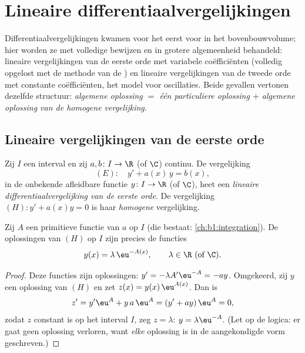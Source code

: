 \chapter{Lineaire differentiaalvergelijkingen}\label{ch:b1:diffeq}

Differentiaalvergelijkingen kwamen voor het eerst voor in het
bovenbouwvolume; hier worden ze met volledige bewijzen en in grotere
algemeenheid behandeld: lineaire vergelijkingen van de eerste orde met
variabele coëfficiënten (volledig opgelost met de methode van de ) en lineaire vergelijkingen van de tweede orde met
constante coëfficiënten, het model voor oscillaties. Beide gevallen
vertonen dezelfde structuur: \emph{algemene oplossing $=$ één particuliere
oplossing $+$ algemene oplossing van de homogene vergelijking}.

\section{Lineaire vergelijkingen van de eerste orde}

\begin{definition}\label{def:b1:diffeq:linear1}
Zij $I$ een interval en zij $a, b \colon I \to \R$ (of $\C$) continu. De
vergelijking
\[
(E)\colon\quad y' + a(x)\,y = b(x),
\]
in de onbekende afleidbare functie $y \colon I \to \R$ (of $\C$), heet een
\emph{lineaire differentiaalvergelijking van de eerste
orde}. De
vergelijking $(H)\colon y' + a(x) y = 0$ is haar \emph{homogene}
vergelijking.
\end{definition}

\begin{theorem}\label{thm:b1:diffeq:homogeneous1}
Zij $A$ een primitieve functie van $a$ op $I$ (die bestaat:
\cref{ch:b1:integration}). De oplossingen van $(H)$ op $I$ zijn precies de
functies
\[
y(x) = \lambda\, \eu^{-A(x)}, \qquad \lambda \in \R \text{ (of } \C).
\]
\end{theorem}

\begin{proof}
Deze functies zijn oplossingen: $y' = -\lambda A' \eu^{-A} = -a y$.
Omgekeerd, zij $y$ een oplossing van $(H)$ en zet $z(x) = y(x)\,
\eu^{A(x)}$. Dan is
\[
z' = y' \eu^{A} + y\, a\, \eu^{A} = (y' + ay)\, \eu^{A} = 0 ,
\]
zodat $z$ constant is op het interval $I$, zeg $z = \lambda$: $y = \lambda
\eu^{-A}$. (Let op de logica: er gaat geen oplossing verloren, want
\emph{elke} oplossing is in de aangekondigde vorm geschreven.)
\end{proof}

